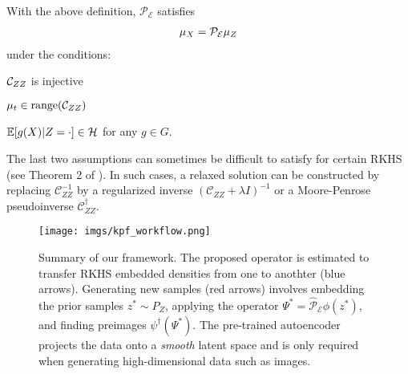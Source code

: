 \begin{proposition} \label{prop:kpf}
With the above definition, $\mathcal{P}_\mathcal{E}$ satisfies
\begin{align}
   \mu_{\var{x}} = \mathcal{P}_\mathcal{E}\mu_{\var{z}}
\end{align}
under the conditions:   \begin{inparaenum}[\bfseries (i)] \item $\mathcal{C}_{\var{z}\var{z}}$ is injective \item $\mu_{t} \in \text{range}(\mathcal{C}_{\var{z}\var{z}})$ \item $\mathbb{E}[g(\var{x})|\var{z} = \cdot] \in \mathcal{H}$ for any $g \in G$.\end{inparaenum}
\end{proposition}
The last two assumptions can sometimes be difficult to satisfy for certain RKHS (see Theorem 2 of \citet{fukumizu2013kernel}).  In such cases, a relaxed solution can be constructed by replacing $\mathcal{C}^{-1}_{ZZ}$ by a regularized inverse $(\mathcal{C}_{ZZ} + \lambda I)^{-1}$ or a Moore-Penrose pseudoinverse $\mathcal{C}^\dagger_{ZZ}$.

\begin{figure}[t]
    \centering
    \vspace{-1em}
    \texttt{[image: imgs/kpf\_workflow.png]}
    \vspace{-8pt}
    \caption{Summary of our framework. The proposed operator is estimated to transfer RKHS embedded densities from one to anothter (blue arrows). Generating new samples (red arrows) involves embedding the prior samples $z^* \sim P_Z$, applying the operator $\Psi^* = \hat{\mathcal{P}}_\mathcal{E}\phi(z^*)$, and finding preimages $\psi^\dagger(\Psi^*)$. The pre-trained autoencoder projects the data onto a \textit{smooth} latent space and is only required when generating high-dimensional data such as images.}
    \label{fig:kpf_workflow}
\end{figure}

